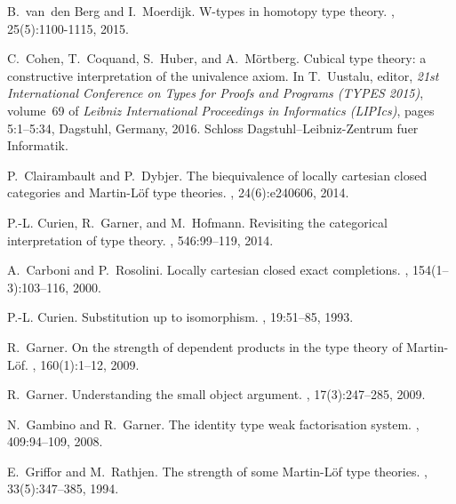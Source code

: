 \documentclass[reqno,10pt,a4paper,oneside,draft]{amsart}
\numberwithin{equation}{section}
\theoremstyle{mythm}
\theoremstyle{mydef}
\theoremstyle{myrmk}
\begin{document}
\begin{thebibliography}{{}dBM15}
B.~{}van~den Berg and I.~Moerdijk.
\newblock W-types in homotopy type theory.
, 25(5):1100-1115,
  2015.

C.~Cohen, T.~Coquand, S.~Huber, and A.~M\"ortberg.
\newblock Cubical type theory: a constructive interpretation of the univalence
  axiom.
\newblock In T.~Uustalu, editor, {\em 21st International Conference on Types
  for Proofs and Programs (TYPES 2015)}, volume~69 of {\em Leibniz
  International Proceedings in Informatics (LIPIcs)}, pages 5:1--5:34,
  Dagstuhl, Germany, 2016. Schloss Dagstuhl--Leibniz-Zentrum fuer Informatik.

P.~Clairambault and P.~Dybjer.
\newblock The biequivalence of locally cartesian closed categories and
  {M}artin-{L}\"{o}f type theories.
, 24(6):e240606,
  2014.

P.-L. Curien, R.~Garner, and M.~Hofmann.
\newblock Revisiting the categorical interpretation of type theory.
, 546:99--119, 2014.

A.~Carboni and P.~Rosolini.
\newblock Locally cartesian closed exact completions.
, 154(1--3):103--116, 2000.

P.-L. Curien.
\newblock Substitution up to isomorphism.
, 19:51--85, 1993.

R.~Garner.
\newblock On the strength of dependent products in the type theory of
  {M}artin-{L}\"of.
, 160(1):1--12, 2009.

R.~Garner.
\newblock Understanding the small object argument.
, 17(3):247--285, 2009.

N.~Gambino and R.~Garner.
\newblock The identity type weak factorisation system.
, 409:94--109, 2008.

E.~Griffor and M.~Rathjen.
\newblock The strength of some {M}artin-{L}\"of type theories.
, 33(5):347--385, 1994.


\end{thebibliography}
\end{document}
